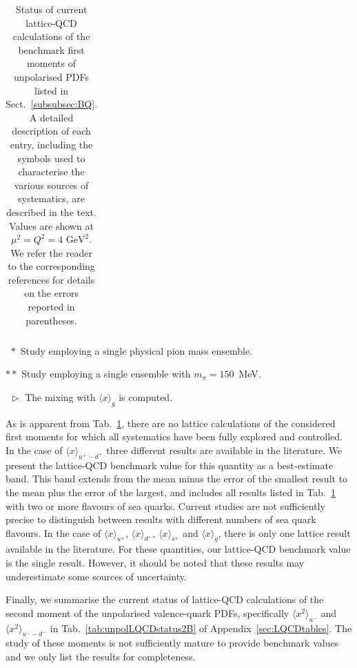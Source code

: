 \begin{table}[!t]
\begin{threeparttable}
\begin{tabular}{llcllccccccl}
\bottomrule
\end{tabular}
\begin{tablenotes}
\footnotesize
\item[$\ \,*$] Study employing a single physical pion mass ensemble.
\item[$**$] Study employing a single ensemble with $m_\pi=150$~MeV.
\item[$\ \,\triangleright$] The mixing with $\langle x\rangle_{g}$ is computed.
\end{tablenotes}
\end{threeparttable}
\caption{\small Status of current lattice-QCD calculations of the benchmark 
first moments of unpolarised PDFs listed in Sect.~\ref{subsubsec:BQ}.
%
A detailed description of each entry, including the symbols used to 
characterise the various sources of systematics, are described in the text.
%
Values are shown at $\mu^2=Q^2=4\mbox{ GeV}^2$.
%
We refer the reader to the corresponding references for details on the 
errors reported in parentheses.}
\label{tab:unpolLQCDstatus1}
\end{table}

As is apparent from Tab.~\ref{tab:unpolLQCDstatus1}, there are no lattice 
calculations of the considered first moments for which all systematics 
have been fully explored and controlled. 
%
In the case of $\langle x\rangle_{u^+-d^+}$ three different results are available 
in the literature.
%
We present the lattice-QCD benchmark value for this quantity 
as a best-estimate band.
% 
This band extends from the mean minus the error of the smallest result to the 
mean plus the error of the largest, and includes all results listed in 
Tab.~\ref{tab:unpolLQCDstatus1} with two or more flavours of sea quarks.
%
Current studies are not sufficiently precise to distinguish between 
results with different numbers of sea quark flavours.
%
In the case of $\langle x \rangle_{u^+}$, $\langle x \rangle_{d^+}$, 
$\langle x \rangle_{s^+}$ and $\langle x \rangle_g$, there is only one
lattice result available in the literature. 
%
For these quantities, our lattice-QCD benchmark value is the single result.
% 
However, it should be noted that these results may underestimate some sources 
of uncertainty. 

Finally, we summarise the current status of lattice-QCD calculations of the 
second moment of the unpolarised valence-quark PDFs, specifically 
$\langle x^2 \rangle_{u^-}$ and $\langle x^2\rangle_{u^--d^-}$
in Tab.~\ref{tab:unpolLQCDstatus2B} of Appendix~\ref{sec:LQCDtables}.
% 
The study of these moments is not sufficiently mature to provide benchmark 
values and we only list the results for completeness.

